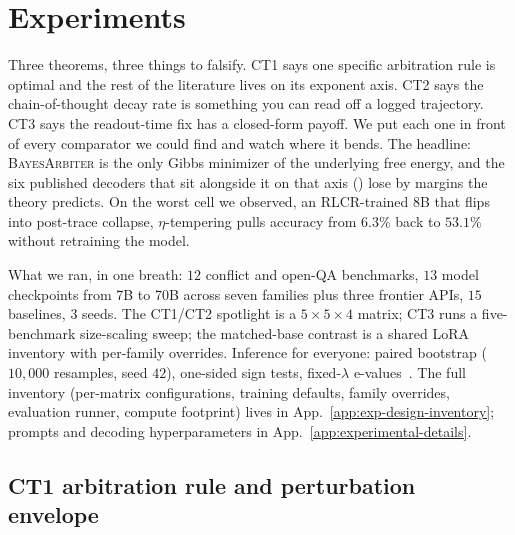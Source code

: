 \section{Experiments}
\label{sec:experiments}

Three theorems, three things to falsify. CT1 says one specific arbitration rule is optimal and the rest of the literature lives on its exponent axis. CT2 says the chain-of-thought decay rate is something you can read off a logged trajectory. CT3 says the readout-time fix has a closed-form payoff. We put each one in front of every comparator we could find and watch where it bends. The headline: \textsc{BayesArbiter} is the only Gibbs minimizer of the underlying free energy, and the six published decoders that sit alongside it on that axis () lose by margins the theory predicts. On the worst cell we observed, an RLCR-trained 8B that flips into post-trace collapse, $\eta$-tempering pulls accuracy from $6.3\%$ back to $53.1\%$ without retraining the model.

What we ran, in one breath: $12$ conflict and open-QA benchmarks, $13$ model checkpoints from 7B to 70B across seven families plus three frontier APIs, $15$ baselines, $3$ seeds. The CT1/CT2 spotlight is a $5\!\times\!5\!\times\!4$ matrix; CT3 runs a five-benchmark size-scaling sweep; the matched-base contrast is a shared LoRA inventory with per-family overrides. Inference for everyone: paired bootstrap ($10{,}000$ resamples, seed $42$), one-sided sign tests, fixed-$\lambda$ e-values~\citep{shafer2021testing,ramdas2023game}. The full inventory (per-matrix configurations, training defaults, family overrides, evaluation runner, compute footprint) lives in App.~\ref{app:exp-design-inventory}; prompts and decoding hyperparameters in App.~\ref{app:experimental-details}.

\subsection{CT1 arbitration rule and perturbation envelope}
\label{sec:ct1-ct3-exp}
\label{sec:thm12-exp}

